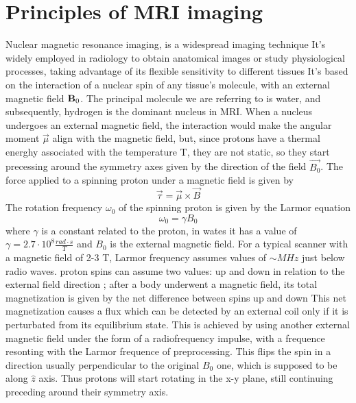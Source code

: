\documentclass[a4paper,11pt]{article}
\begin{document}
\section{Principles of MRI imaging}
Nuclear magnetic resonance imaging, is a widespread imaging technique It's widely employed in radiology to obtain anatomical images or study physiological processes, taking advantage of its flexible sensitivity to different tissues
It's based on the interaction of a nuclear spin of any tissue's molecule, with an external magnetic field $\textbf B_0$.
The principal molecule we are referring to is water, and subsequently, hydrogen is the dominant nucleus in MRI.
When a nucleus undergoes an external magnetic field, the interaction would make the angular moment $\overrightarrow{\mu}$ align with the magnetic field,
but, since protons have a thermal energhy associated with the temperature T, they are not static, so they start precessing around the symmetry axes given by the direction of the field $\overrightarrow{B_0}$.
The force applied to a spinning proton under a magnetic field is given by
\begin{equation}
\overrightarrow{\tau} = \overrightarrow{\mu} \times \overrightarrow{B}
\end{equation}
The rotation frequency $\omega_0$ of the spinning proton is given by the Larmor equation
\begin{equation}\label{eq:larmorfrequency}
\omega_0 = \gamma B_0
\end{equation}
where $\gamma$ is a constant related to the proton, in wates it has a value of $\gamma = 2.7\cdot 10^8 \frac{rad\cdot s}{T}$ and $B_0$ is the external magnetic field. For a typical scanner with a magnetic field of 2-3 T, Larmor frequency assumes values of $\sim MHz$ just below radio waves.
proton spins can assume two values: up and down in relation to the external field direction ; after a body  underwent a magnetic field, its total magnetization is given by the net difference between spins up and down
This net magnetization causes a flux which can be detected by an external coil only if it is perturbated from its equilibrium state. This is achieved by using another external magnetic field under the form of a radiofrequency impulse, with a frequence resonting with the Larmor frequence of preprocessing. This flips the spin in a direction usually perpendicular to the original $B_0$ one, which is supposed to be along $\hat z$ axis. Thus protons will start rotating in the x-y plane, still continuing preceding around their symmetry axis.
\end{document}
